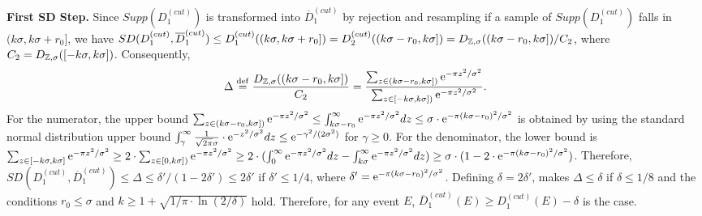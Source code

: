 \begin{sloppypar}
  \textbf{First SD Step.} Since $Supp(D_1^{(cut)})$ is transformed into
  $\overline{D}_1^{(cut)}$ by rejection and resampling if a sample of
  $Supp(D_1^{(cut)})$ falls in $(k\sigma,k\sigma+r_0]$, we have
  $SD(D_1^{(cut)}, \overline{D}_1^{(cut)}) \leq
  D_1^{(cut)}((k\sigma,k\sigma+r_0]) = D_2^{(cut)}((k\sigma-r_0,k\sigma]) =
  D_{\mathbb{Z},\sigma}((k\sigma-r_0,k\sigma])/C_2$, where
  $C_2 = D_{\mathbb{Z},\sigma}([-k\sigma,k\sigma])$. Consequently,
$$
\Delta \stackrel{\mathrm{def}}{=} \frac{D_{\mathbb{Z},\sigma}((k\sigma-r_0,k\sigma])}{C_2} = \frac{\sum_{z
    \in (k\sigma-r_0,k\sigma])} \mathrm{e}^{-\pi z^2/\sigma^2}}{\sum_{z \in
    [-k\sigma,k\sigma])} \mathrm{e}^{-\pi z^2/\sigma^2}}.
$$
For the numerator, the upper bound
$\sum_{z \in (k\sigma-r_0,k\sigma])} \mathrm{e}^{-\pi z^2/\sigma^2} \leq
\int^{\infty}_{k\sigma-r_0} \mathrm{e}^{-\pi z^2/\sigma^2} dz \leq \sigma \cdot \mathrm{e}^{-\pi
  (k\sigma-r_0)^2/\sigma^2}$ is obtained by using the standard normal distribution upper bound
$\int^{\infty}_{\gamma} \frac{1}{\sqrt{2\pi} \sigma} \cdot \mathrm{e}^{- z^2/\sigma^2}
dz \leq \mathrm{e}^{-\gamma^2/(2\sigma^2)}$ for $\gamma \geq 0$. For the denominator, the lower bound is
$\sum_{z \in [-k\sigma,k\sigma]} \mathrm{e}^{-\pi z^2/\sigma^2} \geq 2 \cdot \sum_{z \in
  [0,k\sigma])} \mathrm{e}^{-\pi z^2/\sigma^2} \geq 2 \cdot (\int^{\infty}_{0} \mathrm{e}^{-\pi
  z^2/\sigma^2} dz - \int^{\infty}_{k\sigma} \mathrm{e}^{-\pi z^2/\sigma^2} dz) \geq
\sigma \cdot (1 - 2 \cdot \mathrm{e}^{-\pi (k\sigma-r_0)^2/\sigma^2})$. Therefore,
$SD(D_1^{(cut)}, \overline{D}_1^{(cut)}) \leq \Delta \leq \delta' / (1-2\delta')
\leq 2\delta'$ if $\delta' \leq 1/4$, where
$\delta' = \mathrm{e}^{-\pi (k\sigma-r_0)^2/\sigma^2}$. Defining $\delta = 2\delta'$, makes $\Delta \leq \delta$ if $\delta \leq 1/8$ and the conditions
$r_0 \leq \sigma$ and $k \geq 1 + \sqrt{1/\pi \cdot \ln(2/\delta)}$
hold. Therefore, for any event $E$, 
$\overline{D}_1^{(cut)}(E) \geq D_1^{(cut)}(E) - \delta$ is the case.
\end{sloppypar}

